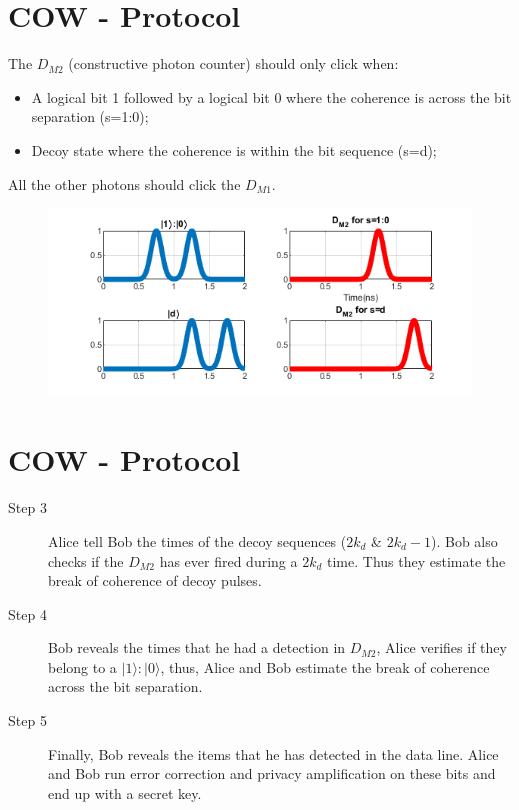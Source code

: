 \documentclass[40pt]{article}
\newcommand{\mysection}[1]{\section*{\color{black}\sffamily #1}}%
\begin{document}

\mysection{\Huge COW - Protocol}\Large
The $D_{M2}$ (constructive photon counter) should only click when:
\begin{itemize}
\item A logical bit 1 followed by a logical bit 0 where the coherence is across the bit separation (s=1:0);
\item Decoy state where the coherence is within the bit sequence (s=d);
\end{itemize}
All the other photons should click the $D_{M1}$.
  \begin{figure}[hbt]
    	\centering
    	\includegraphics{./figures/Simple2.png}
        	\label{Simple2}
    \end{figure}

\mysection{\Huge COW - Protocol}\Large
\begin{description}

\item [Step 3] Alice tell Bob the times of the decoy sequences ($2k_d$  \& $ 2k_d-1$). Bob also checks if the $D_{M2}$ has ever fired during a $2k_d$ time. Thus they estimate the break of coherence of decoy pulses.

\item [Step 4] Bob reveals the times that he had a detection in $D_{M2}$, Alice verifies if they belong to a $|1\rangle:|0\rangle$, thus, Alice and Bob estimate the break of coherence across the bit separation.

\item [Step 5] Finally, Bob reveals the items that he has detected in the data line. Alice and Bob run error correction and privacy amplification on these bits and end up with a secret key.

\end{description}
\end{document}
